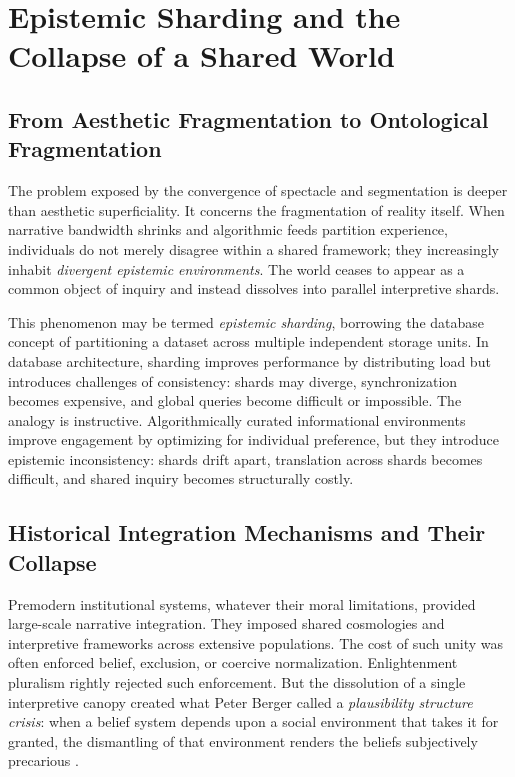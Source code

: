 \documentclass[12pt]{article}
\begin{document}
\section{Epistemic Sharding and the Collapse of a Shared World}
\label{sec:sharding}

\subsection{From Aesthetic Fragmentation to Ontological Fragmentation}

The problem exposed by the convergence of spectacle and segmentation is deeper than aesthetic superficiality. It concerns the fragmentation of reality itself. When narrative bandwidth shrinks and algorithmic feeds partition experience, individuals do not merely disagree within a shared framework; they increasingly inhabit \emph{divergent epistemic environments}. The world ceases to appear as a common object of inquiry and instead dissolves into parallel interpretive shards.

This phenomenon may be termed \emph{epistemic sharding}, borrowing the database concept of partitioning a dataset across multiple independent storage units. In database architecture, sharding improves performance by distributing load but introduces challenges of consistency: shards may diverge, synchronization becomes expensive, and global queries become difficult or impossible. The analogy is instructive. Algorithmically curated informational environments improve engagement by optimizing for individual preference, but they introduce epistemic inconsistency: shards drift apart, translation across shards becomes difficult, and shared inquiry becomes structurally costly.

\subsection{Historical Integration Mechanisms and Their Collapse}

Premodern institutional systems, whatever their moral limitations, provided large-scale narrative integration. They imposed shared cosmologies and interpretive frameworks across extensive populations. The cost of such unity was often enforced belief, exclusion, or coercive normalization. Enlightenment pluralism rightly rejected such enforcement. But the dissolution of a single interpretive canopy created what Peter Berger called a \emph{plausibility structure crisis}: when a belief system depends upon a social environment that takes it for granted, the dismantling of that environment renders the beliefs subjectively precarious \citep{Berger1967}.
\end{document}
